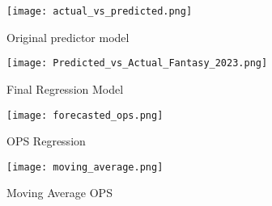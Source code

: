 \documentclass[12pt, english]{article}
\begin{document}
\begin{figure}
    \centering
    \texttt{[image: actual\_vs\_predicted.png]}
    \caption{Original predictor model}
    \label{fig:Figure A}
\end{figure}

\begin{figure}
    \centering
    \texttt{[image: Predicted\_vs\_Actual\_Fantasy\_2023.png]}
    \caption{Final Regression Model}
    \label{fig:figure B}
\end{figure}

\begin{figure}
    \centering
    \texttt{[image: forecasted\_ops.png]}
    \caption{OPS Regression}
    \label{fig:figure C}
\end{figure}

\begin{figure}
    \centering
    \texttt{[image: moving\_average.png]}
    \caption{Moving Average OPS}
    \label{fig:figure D}
\end{figure}
\end{document}
